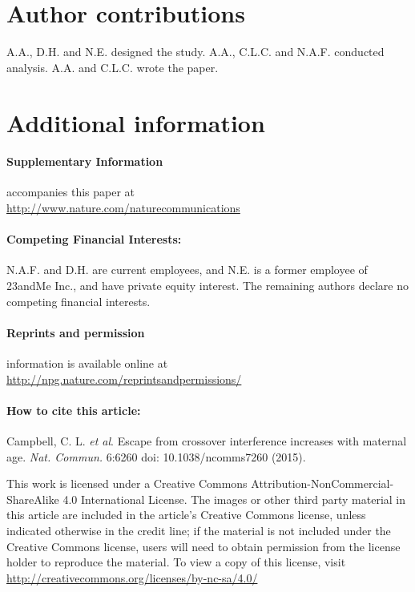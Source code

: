 \section{Author contributions}
A.A., D.H. and N.E. designed the study. A.A., C.L.C. and N.A.F. conducted analysis.
A.A. and C.L.C. wrote the paper.

\section{Additional information}

\paragraph{Supplementary Information} accompanies this paper at \\ \url{http://www.nature.com/naturecommunications}

\paragraph{Competing Financial Interests:} N.A.F. and D.H. are current employees, and N.E. is a
former employee of 23andMe Inc., and have private equity interest. The remaining
authors declare no competing financial interests.

\paragraph{Reprints and permission} information is available online at \\
\url{http://npg.nature.com/reprintsandpermissions/}

\paragraph{How to cite this article:} Campbell, C. L. \textit{et al}. Escape from crossover interference
increases with maternal age. \textit{Nat. Commun.} 6:6260 doi: 10.1038/ncomms7260 (2015).

\bigskip \noindent
This work is licensed under a 
Creative Commons Attribution-NonCommercial-ShareAlike 4.0 International License. The images or
other third party material in this article are included in the article's Creative Commons
license, unless indicated otherwise in the credit line; if the material is not included under
the Creative Commons license, users will need to obtain permission from the license
holder to reproduce the material. To view a copy of this license, visit \\
\url{http://creativecommons.org/licenses/by-nc-sa/4.0/}

